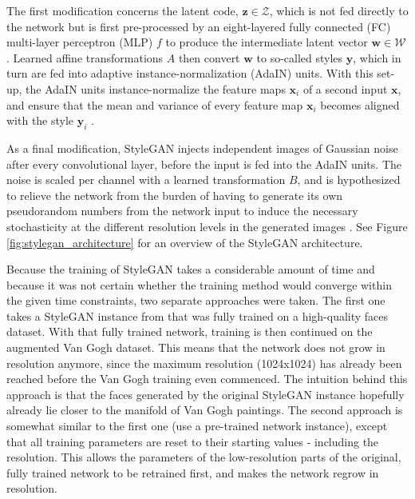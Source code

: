 \documentclass{article}
\begin{document}
The first modification concerns the latent code, $\mathbf{z} \in \mathcal{Z}$, which is not fed directly to the network but is first pre-processed by an eight-layered fully connected (FC) multi-layer perceptron (MLP) $f$ to produce the intermediate latent vector $\mathbf{w} \in \mathcal{W}$. Learned affine transformations $A$ then convert $\mathbf{w}$ to so-called styles $\mathbf{y}$, which in turn are fed into adaptive instance-normalization (AdaIN) units. With this set-up, the AdaIN units instance-normalize the feature maps $\mathbf{x}_i$ of a second input $\mathbf{x}$, and ensure that the mean and variance of every feature map $\mathbf{x}_i$ becomes aligned with the style $\mathbf{y}_i$ \cite{huang2017arbitrary, karras2019stylebased}.

As a final modification, StyleGAN injects independent images of Gaussian noise after every convolutional layer, before the input is fed into the AdaIN units. The noise is scaled per channel with a learned transformation $B$, and is hypothesized to relieve the network from the burden of having to generate its own pseudorandom numbers from the network input to induce the necessary stochasticity at the different resolution levels in the generated images \cite{karras2019stylebased}. See Figure \ref{fig:stylegan_architecture} for an overview of the StyleGAN architecture.

Because the training of StyleGAN takes a considerable amount of time and because it was not certain whether the training method would converge within the given time constraints, two separate approaches were taken. The first one takes a StyleGAN instance from \cite{karras2019stylebased} that was fully trained on a high-quality faces dataset. With that fully trained network, training is then continued on the augmented Van Gogh dataset. This means that the network does not grow in resolution anymore, since the maximum resolution (1024x1024) has already been reached before the Van Gogh training even commenced. The intuition behind this approach is that the faces generated by the original StyleGAN instance hopefully already lie closer to the manifold of Van Gogh paintings. The second approach is somewhat similar to the first one (use a pre-trained network instance), except that all training parameters are reset to their starting values - including the resolution. This allows the parameters of the low-resolution parts of the original, fully trained network to be retrained first, and makes the network regrow in resolution.
\end{document}

